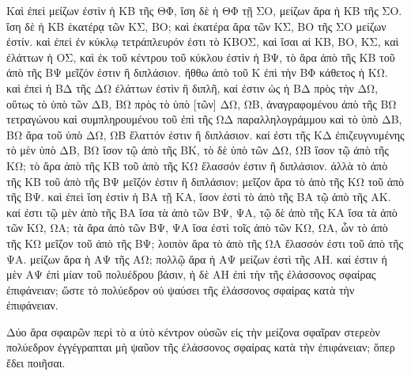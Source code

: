 \begin{Parallel}{}{}
{{\greekfont Καὶ ἐπεὶ μείζων ἐστὶν ἡ ΚΒ τῆς ΘΦ, ἴση δὲ ἡ ΘΦ τῇ ΣΟ, μείζων ἄρα ἡ ΚΒ τῆς ΣΟ. ἴση
δὲ ἡ ΚΒ ἑκατέρᾳ τῶν ΚΣ, ΒΟ; καὶ ἑκατέρα ἄρα τῶν ΚΣ, ΒΟ τῆς ΣΟ μείζων ἐστίν. καὶ ἐπεὶ
ἐν κύκλῳ τετράπλευρόν ἐστι τὸ ΚΒΟΣ, καὶ ἴσαι αἱ ΚΒ, ΒΟ, ΚΣ, καὶ ἐλάττων ἡ ΟΣ, καὶ
ἐκ τοῦ κέντρου τοῦ κύκλου ἐστὶν ἡ ΒΨ, τὸ ἄρα ἀπὸ τῆς ΚΒ τοῦ ἀπὸ τῆς ΒΨ μεῖζόν ἐστιν 	ἢ διπλάσιον. ἤθθω
ἀπὸ τοῦ Κ ἐπὶ τὴν ΒΦ κάθετος ἡ ΚΩ. καὶ ἐπεὶ ἡ ΒΔ τῆς ΔΩ ἐλάττων ἐστὶν ἢ διπλῆ, καί ἐστιν ὡς ἡ ΒΔ πρὸς
τὴν ΔΩ, οὕτως τὸ ὑπὸ τῶν ΔΒ, ΒΩ πρὸς τὸ ὑπὸ [τῶν] ΔΩ, ΩΒ, ἀναγραφομένου ἀπὸ τῆς ΒΩ τετραγώνου
καὶ συμπληρουμένου τοῦ ἐπὶ τῆς ΩΔ παραλληλογράμμου καὶ τὸ ὑπὸ ΔΒ, ΒΩ ἄρα τοῦ ὑπὸ ΔΩ,
ΩΒ ἔλαττόν ἐστιν ἢ διπλάσιον. καί ἐστι τῆς ΚΔ
ἐπιζευγνυμένης τὸ μὲν ὑπὸ ΔΒ, ΒΩ  ἴσον τῷ ἀπὸ τῆς ΒΚ, τὸ δὲ ὑπὸ τῶν ΔΩ, ΩΒ ἴσον τῷ ἀπὸ
τῆς ΚΩ; τὸ ἄρα ἀπὸ τῆς ΚΒ τοῦ ἀπὸ τῆς ΚΩ ἔλασσόν ἐστιν ἢ διπλάσιον. ἀλλὰ τὸ ἀπὸ τῆς ΚΒ τοῦ
ἀπὸ τῆς ΒΨ μεῖζόν ἐστιν ἢ διπλάσιον; μεῖζον ἄρα τὸ ἀπὸ τῆς  ΚΩ τοῦ ἀπὸ τῆς ΒΨ. καὶ ἐπεὶ
ἴση ἐστὶν ἡ ΒΑ τῇ ΚΑ,  ἴσον ἐστὶ τὸ ἀπὸ τῆς ΒΑ τῷ ἀπὸ τῆς ΑΚ. καί ἐστι τῷ μὲν ἀπὸ τῆς ΒΑ ἴσα
τὰ ἀπὸ τῶν ΒΨ, ΨΑ, τῷ δὲ ἀπὸ τῆς ΚΑ ἴσα τὰ ἀπὸ τῶν ΚΩ, ΩΑ; τὰ ἄρα ἀπὸ τῶν ΒΨ, ΨΑ ἴσα
ἐστὶ τοῖς ἀπὸ τῶν ΚΩ, ΩΑ, ὧν τὸ ἀπὸ τῆς ΚΩ μεῖζον τοῦ ἀπὸ τῆς ΒΨ; λοιπὸν ἄρα τὸ ἀπὸ
τῆς ΩΑ ἔλασσόν ἐστι τοῦ ἀπὸ τῆς ΨΑ. μείζων ἄρα ἡ ΑΨ τῆς ΑΩ; πολλῷ ἄρα ἡ  ΑΨ μείζων ἐστὶ
τῆς ΑΗ. καί ἐστιν ἡ μὲν ΑΨ ἐπὶ μίαν τοῦ πολυέδρου βάσιν, ἡ δὲ ΑΗ ἐπὶ τὴν τῆς ἐλάσσονος
σφαίρας ἐπιφάνειαν; ὥστε τὸ πολύεδρον οὐ ψαύσει τῆς ἐλάσσονος σφαίρας κατὰ τὴν ἐπιφάνειαν.}

{\greekfont Δύο ἄρα σφαιρῶν περὶ τὸ α ὐτὸ κέντρον οὐσῶν εἰς τὴν μείζονα σφαῖραν στερεὸν πολύεδρον
ἐγγέγραπται μὴ ψαῦον τῆς ἐλάσσονος σφαίρας κατὰ τὴν ἐπιφάνειαν; ὅπερ ἔδει ποιῆσαι.}}

\end{Parallel}
